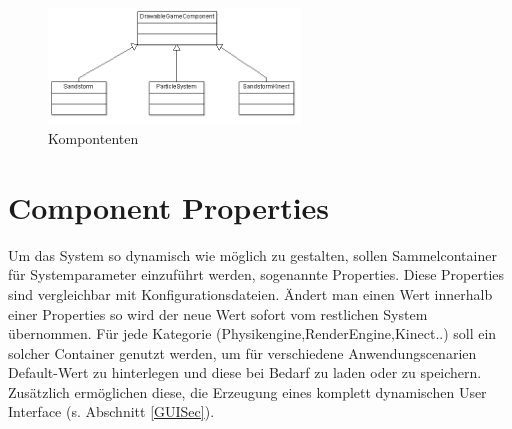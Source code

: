 \begin{Spacing}{\mylinespace}
\begin{figure}[h!]
	\centering
	\vspace*{20px}
	\includegraphics[width=0.6\textwidth]{graphics/DrawableGame.png}
	\caption{Kompontenten}
	\label{fig:singleColor}
\end{figure}

\section{Component Properties} \label{PropSec}
Um das  System so dynamisch wie möglich zu gestalten, sollen Sammelcontainer für Systemparameter einzuführt werden, sogenannte Properties.
Diese Properties sind vergleichbar mit Konfigurationsdateien. Ändert man einen Wert innerhalb einer Properties so wird der neue Wert sofort vom restlichen System übernommen. Für jede Kategorie (Physikengine,RenderEngine,Kinect..) soll ein solcher Container genutzt werden, um für verschiedene Anwendungscenarien Default-Wert zu hinterlegen und diese bei Bedarf zu laden oder zu speichern. Zusätzlich ermöglichen diese, die Erzeugung eines komplett dynamischen User Interface (s. Abschnitt \ref{GUISec}).

\end{Spacing}
\newpage
\clearpage

